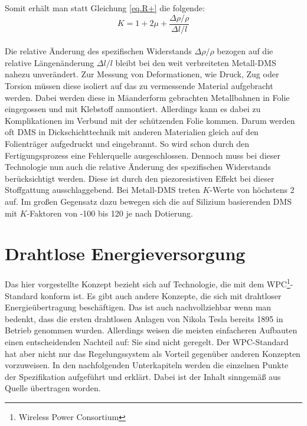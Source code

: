 \documentclass[12pt]{scrreprt} %
\begin{document}
Somit erhält man statt Gleichung \vref{eq.R+} die folgende:\\
\begin{equation}
K=1+2\mu+\frac{\displaystyle\Delta \rho / \rho}{\displaystyle\Delta l / l}
\end{equation}\\
Die relative Änderung des spezifischen Widerstands $\Delta \rho/ \rho$ bezogen auf die relative Längenänderung $\Delta l/ l$ bleibt bei den weit verbreiteten Metall-DMS nahezu unverändert. Zur Messung von Deformationen, wie Druck, Zug oder Torsion müssen diese isoliert auf das zu vermessende Material aufgebracht werden. Dabei werden diese in Mäanderform gebrachten Metallbahnen in Folie eingegossen und mit Klebstoff anmontiert. Allerdings kann es dabei zu Komplikationen im Verbund mit der schützenden Folie kommen. Darum werden oft DMS in Dickschichttechnik mit anderen Materialien gleich auf den Folienträger aufgedruckt und eingebrannt. So wird schon durch den Fertigungsprozess eine Fehlerquelle ausgeschlossen. Dennoch muss bei dieser Technologie nun auch die relative Änderung des spezifischen Widerstands berücksichtigt werden. Diese ist durch den piezoresistiven Effekt bei dieser Stoffgattung ausschlaggebend. Bei Metall-DMS treten $K$-Werte von höchstens 2 auf. Im großen Gegensatz dazu bewegen sich die auf Silizium basierenden DMS mit $K$-Faktoren von -100 bis 120 je nach Dotierung. 
\section{Drahtlose Energieversorgung}
Das hier vorgestellte Konzept bezieht sich auf Technologie, die mit dem WPC\footnote{Wireless Power Consortium}-Standard konform ist. Es gibt auch andere Konzepte, die sich mit drahtloser Energieübertragung beschäftigen. Das ist auch nachvollziehbar wenn man bedenkt, dass die ersten drahtlosen Anlagen von Nikola Tesla bereits 1895 in Betrieb genommen wurden\citep{TESLA}. Allerdings weisen die meisten einfacheren Aufbauten einen entscheidenden Nachteil auf: Sie sind nicht geregelt. Der WPC-Standard hat aber nicht nur das Regelungssystem als Vorteil gegenüber anderen Konzepten vorzuweisen. In den nachfolgenden Unterkapiteln werden die einzelnen Punkte der Spezifikation aufgeführt und erklärt. Dabei ist der Inhalt sinngemäß aus Quelle \citep{WPC} übertragen worden.
\end{document}
